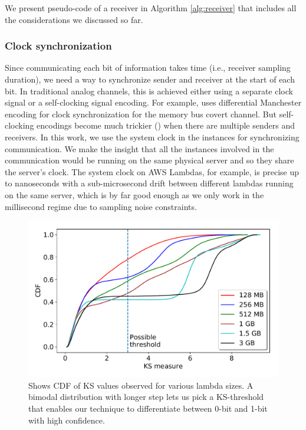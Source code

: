 We present pseudo-code of a receiver in 
Algorithm \ref{alg:receiver} that includes all the 
considerations we discussed so far.

\subsubsection{Clock synchronization} 
Since communicating each bit of information takes time (i.e., receiver sampling
duration), we need a way to synchronize sender and receiver at the start of each
bit. In traditional analog channels, this is achieved either using a separate
clock signal or a self-clocking signal encoding. For example, \cite{whispers}
uses differential Manchester encoding for clock synchronization for the memory
bus covert channel.  But self-clocking encodings  become much trickier
() when there are multiple senders and receivers. In this work, we
use the system clock in the instances for synchronizing communication. We make
the insight that all the instances involved in the communication would be
running on the same physical server and so they share the server's clock.  The
system clock on AWS Lambdas, for example, is precise up to nanoseconds with a
sub-microsecond drift between different lambdas running on the same server,
which is by far good enough as we only work in the millisecond regime due to
sampling noise constraints.


\begin{figure}[!t]
  \includegraphics[width=.99\linewidth]{fig/ksvalues.pdf}
  \caption{Shows CDF of KS values observed for various lambda sizes. A bimodal distribution 
  with longer step lets us pick a KS-threshold that enables our technique to differentiate 
  between 0-bit and 1-bit with high confidence. 
\label{fig:ks_values}}
\end{figure}

